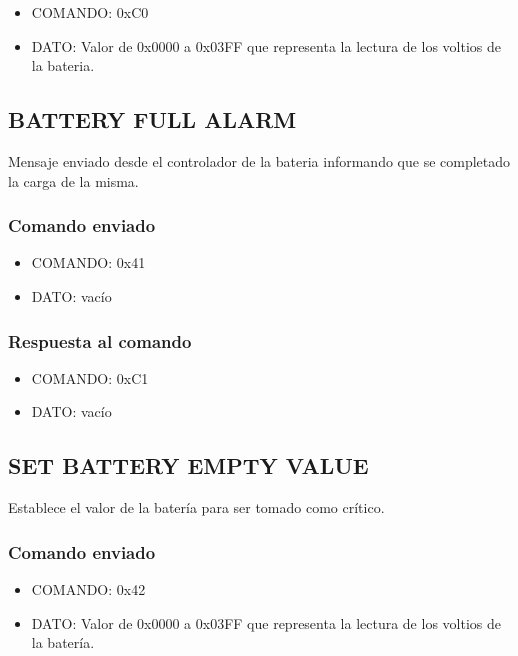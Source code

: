 \documentclass[a4paper,10pt]{article}
\begin{document}
\begin{itemize}
	\item{COMANDO:} 0xC0
	\item{DATO:} Valor de 0x0000 a 0x03FF que representa la lectura de los voltios de la bateria.
\end{itemize}

\subsection{BATTERY FULL ALARM}
\label{battery_full_alarm}

Mensaje enviado desde el controlador de la bateria informando que se completado la carga de la misma.

\subsubsection*{Comando enviado}

\begin{itemize}
	\item{COMANDO:} 0x41
	\item{DATO:} vac\'io
\end{itemize}

\subsubsection*{Respuesta al comando}

\begin{itemize}
	\item{COMANDO:} 0xC1
	\item{DATO:} vac\'io
\end{itemize}

\subsection{SET BATTERY EMPTY VALUE}
\label{set_battery_empty_value}

Establece el valor de la bater\'ia para ser tomado como cr\'itico.

\subsubsection*{Comando enviado}

\begin{itemize}
	\item{COMANDO:} 0x42
	\item{DATO:} Valor de 0x0000 a 0x03FF que representa la lectura de los voltios de la bater\'ia.
\end{itemize}
\end{document}
